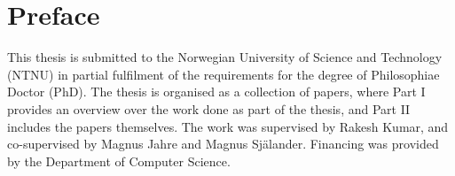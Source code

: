 \documentclass[../main.tex]{subfiles}
\begin{document}
\chapter{Preface}

This thesis is submitted to the Norwegian University of Science and Technology (NTNU) in partial fulfilment of the requirements for the degree of Philosophiae Doctor (PhD). The thesis is organised as a collection of papers, where Part I provides an overview over the work done as part of the thesis, and Part II includes the papers themselves. The work was supervised by Rakesh Kumar, and co-supervised by Magnus Jahre and Magnus Själander. Financing was provided by the Department of Computer Science.
\end{document}

